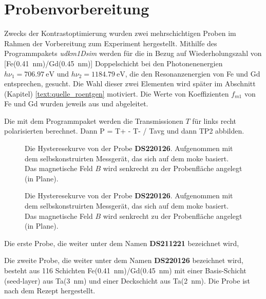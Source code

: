 \section{Probenvorbereitung}
Zwecks der Kontrastoptimierung wurden zwei mehrschichtigen Proben im Rahmen der Vorbereitung zum Experiment hergestellt. Mithilfe des Programmpakets \textit{udkm1Dsim} \cite{schick_udkm1dsim_2021} werden für die  in Bezug auf Wiederholungszahl von [Fe(\SI{0.41}{\nano\meter})/Gd(\SI{0.45}{\nano\meter})] Doppelschicht bei den Photonenenergien $h\nu_1 = \SI{706.97}{\eV}$ und $h\nu_2 = \SI{1184.79}{\eV}$, die den Resonanzenergien von Fe und Gd entsprechen, gesucht. Die Wahl dieser zwei Elementen wird später im Abschnitt (Kapitel) \ref{text:quelle_roentgen} motiviert. Die Werte von Koeffizienten $f_{m1}$ von Fe und Gd wurden jeweils aus \cite[Abb. 4]{kortright_resonant_2000} und \cite[Abb. 2]{prieto_x-ray_2005} abgeleitet.

\noindent
Die mit dem Programmpaket werden die Transmissionen $T$ für links recht polarisierten berechnet. Dann P = T+ - T- / Tavg und dann TP2 abbilden.
\begin{figure}[ht]
    \centering
    
    \caption{Die Hysteresekurve von der Probe \textbf{DS220126}. Aufgenommen mit dem selbskonstruirten Messgerät, das sich auf dem \gls{moke} basiert. Das magnetische Feld $B$ wird senkrecht zu der Probenfläche angelegt (in Plane).}
    \label{fig:proben_vergleich}
\end{figure}
\begin{figure}[ht]
    \centering
    
    \caption{Die Hysteresekurve von der Probe \textbf{DS220126}. Aufgenommen mit dem selbskonstruirten Messgerät, das sich auf dem \gls{moke} basiert. Das magnetische Feld $B$ wird senkrecht zu der Probenfläche angelegt (in Plane).}
    \label{fig:proben_vergleich_centered}
\end{figure}

\noindent
Die erste Probe, die weiter unter dem Namen \textbf{DS211221} bezeichnet wird, 

\noindent
Die zweite Probe, die weiter unter dem Namen \textbf{DS220126} bezeichnet wird, besteht aus 116 Schichten Fe(\SI{0.41}{\nano\meter})/Gd(\SI{0.45}{\nano\meter}) mit einer Basis-Schicht (seed-layer) aus
Ta(\SI{3}{\nano\meter}) und einer Deckschicht aus Ta(\SI{2}{\nano\meter}). 
Die Probe ist nach dem Rezept \cite{tripathi_dichroic_2011} hergestellt.


